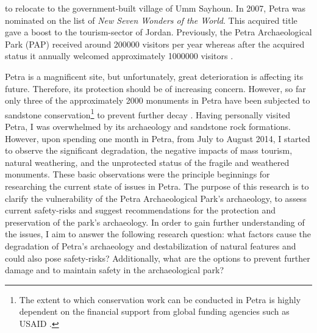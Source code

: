 to relocate to the government-built village of Umm Sayhoun.
In 2007, Petra was nominated on the list of \emph{New Seven Wonders of the World}.
This acquired title gave a boost to the tourism-sector of Jordan.
Previously, the Petra Archaeological Park (PAP) received around \num{200000} visitors per year whereas after the acquired status it annually welcomed approximately \num{1000000} visitors \parencite[176]{paradise2013}.

Petra is a magnificent site, but unfortunately, great deterioration is affecting its future.
Therefore, its protection should be of increasing concern.
However, so far only three of the approximately 2000 monuments in Petra have been subjected to sandstone conservation\footnote{The extent to which conservation work can be conducted in Petra is highly dependent on the financial support from global funding agencies such as USAID 
\parencite[273--275]{balaawi2011}.} 
to prevent further decay 
\parencite[267-284]{balaawi2011}.
Having personally visited Petra, I was overwhelmed by its archaeology and sandstone rock formations.
However, upon spending one month in Petra, from July to August 2014, I started to observe the significant degradation, the negative impacts of mass tourism, natural weathering, and the unprotected status of the fragile and weathered monuments.
These basic observations were the principle beginnings for researching the current state of issues in Petra.
The purpose of this research is to clarify the vulnerability of the Petra Archaeological Park’s archaeology, to assess current safety-risks and suggest recommendations for the protection and preservation of the park’s archaeology.
In order to gain further understanding of the issues, I aim to answer the following research question: what factors cause the degradation of Petra’s archaeology and destabilization of natural features and could also pose safety-risks?
Additionally, what are the options to prevent further damage and to maintain safety in the archaeological park?  

